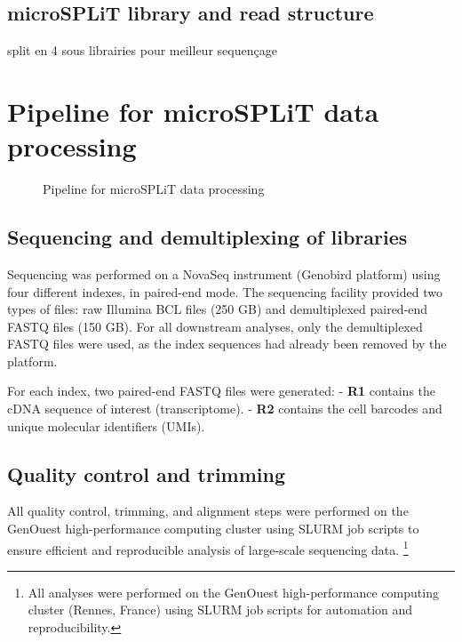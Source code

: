 \documentclass[
  11pt,
  a4paper,
]{report}
\begin{document}
\subsection{microSPLiT library and read
structure}\label{microsplit-library-and-read-structure}

split en 4 sous librairies pour meilleur sequençage

\section{Pipeline for microSPLiT data
processing}\label{pipeline-for-microsplit-data-processing}

\begin{figure}


\caption{\label{fig-pipeline}Pipeline for microSPLiT data processing}

\end{figure}%

\subsection{Sequencing and demultiplexing of
libraries}\label{sequencing-and-demultiplexing-of-libraries}

Sequencing was performed on a NovaSeq instrument (Genobird platform)
using four different indexes, in paired-end mode. The sequencing
facility provided two types of files: raw Illumina BCL files (250 GB)
and demultiplexed paired-end FASTQ files (150 GB). For all downstream
analyses, only the demultiplexed FASTQ files were used, as the index
sequences had already been removed by the platform.

For each index, two paired-end FASTQ files were generated: - \textbf{R1}
contains the cDNA sequence of interest (transcriptome). - \textbf{R2}
contains the cell barcodes and unique molecular identifiers (UMIs).

\subsection{Quality control and
trimming}\label{quality-control-and-trimming}

All quality control, trimming, and alignment steps were performed on the
GenOuest high-performance computing cluster using SLURM job scripts to
ensure efficient and reproducible analysis of large-scale sequencing
data. \footnote{All analyses were performed on the GenOuest
  high-performance computing cluster (Rennes, France) using SLURM job
  scripts for automation and reproducibility.}
\end{document}
